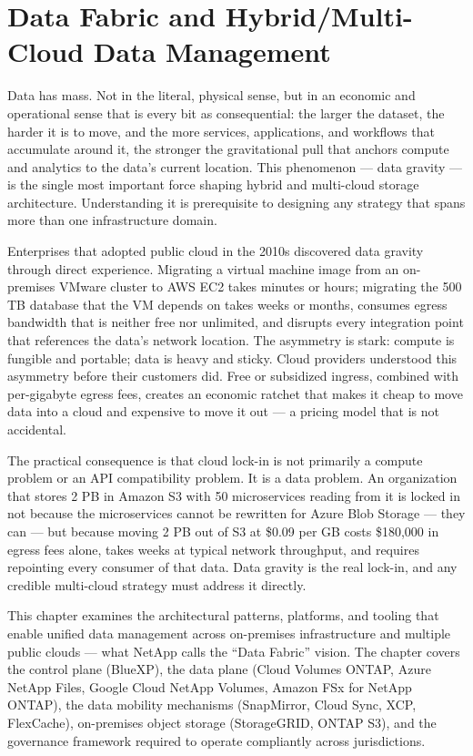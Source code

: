 \chapter{Data Fabric and Hybrid/Multi-Cloud Data Management}
\label{ch:16}

Data has mass. Not in the literal, physical sense, but in an economic and operational sense that is every bit as consequential: the larger the dataset, the harder it is to move, and the more services, applications, and workflows that accumulate around it, the stronger the gravitational pull that anchors compute and analytics to the data's current location. This phenomenon --- data gravity --- is the single most important force shaping hybrid and multi-cloud storage architecture. Understanding it is prerequisite to designing any strategy that spans more than one infrastructure domain.

Enterprises that adopted public cloud in the 2010s discovered data gravity through direct experience. Migrating a virtual machine image from an on-premises VMware cluster to AWS EC2 takes minutes or hours; migrating the 500 TB database that the VM depends on takes weeks or months, consumes egress bandwidth that is neither free nor unlimited, and disrupts every integration point that references the data's network location. The asymmetry is stark: compute is fungible and portable; data is heavy and sticky. Cloud providers understood this asymmetry before their customers did. Free or subsidized ingress, combined with per-gigabyte egress fees, creates an economic ratchet that makes it cheap to move data into a cloud and expensive to move it out --- a pricing model that is not accidental.

The practical consequence is that cloud lock-in is not primarily a compute problem or an API compatibility problem. It is a data problem. An organization that stores 2 PB in Amazon S3 with 50 microservices reading from it is locked in not because the microservices cannot be rewritten for Azure Blob Storage --- they can --- but because moving 2 PB out of S3 at \$0.09 per GB costs \$180,000 in egress fees alone, takes weeks at typical network throughput, and requires repointing every consumer of that data. Data gravity is the real lock-in, and any credible multi-cloud strategy must address it directly.

This chapter examines the architectural patterns, platforms, and tooling that enable unified data management across on-premises infrastructure and multiple public clouds --- what NetApp calls the ``Data Fabric'' vision. The chapter covers the control plane (BlueXP), the data plane (Cloud Volumes ONTAP, Azure NetApp Files, Google Cloud NetApp Volumes, Amazon FSx for NetApp ONTAP), the data mobility mechanisms (SnapMirror, Cloud Sync, XCP, FlexCache), on-premises object storage (StorageGRID, ONTAP S3), and the governance framework required to operate compliantly across jurisdictions.

